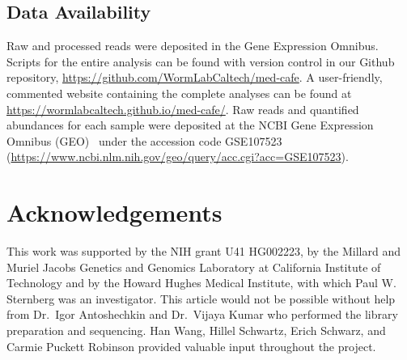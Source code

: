 \documentclass[9pt,twocolumn,twoside]{gsajnl}
\begin{document}
\subsection*{Data Availability}
Raw and processed reads were deposited in the Gene Expression Omnibus. Scripts
for the entire analysis can be found with version control in our Github
repository, \url{https://github.com/WormLabCaltech/med-cafe}. A user-friendly,
commented website containing the complete analyses can be found at
\url{https://wormlabcaltech.github.io/med-cafe/}. Raw reads and quantified
abundances for each sample were deposited at the NCBI Gene Expression Omnibus
(GEO)~\citep{Edgar2002} under the accession code GSE107523
(\url{https://www.ncbi.nlm.nih.gov/geo/query/acc.cgi?acc=GSE107523}).

\section*{Acknowledgements}
This work was supported by the NIH grant U41 HG002223, by the Millard and Muriel
Jacobs Genetics and Genomics Laboratory at California Institute of Technology
and by the Howard Hughes Medical Institute, with which Paul W. Sternberg was an
investigator. This article would not be possible without help from Dr.\ Igor
Antoshechkin and Dr.\ Vijaya Kumar who performed the library preparation and
sequencing. Han Wang, Hillel Schwartz, Erich Schwarz, and Carmie Puckett
Robinson provided valuable input throughout the project.


% 

\end{document}
